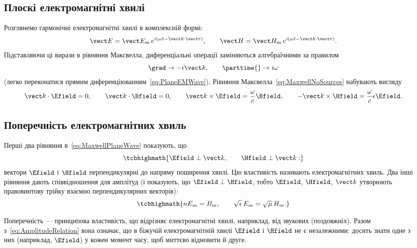 \subsection*{Плоскі електромагнітні хвилі}

Розглянемо гармонічні електромагнітні хвилі в комплексній формі:
\begin{equation}\label{eq:PlaneEMWave}
	\vect E = \vect E_m\, e^{i(\omega t-\vect k\cdot\vect r)}, \qquad \vect H = \vect H_m\, e^{i(\omega t-\vect k\cdot\vect r)}.
\end{equation}
Підставляючи ці вирази в рівняння Максвелла, диференціальні операції заміняються алгебраїчними за правилом
\begin{equation}\label{eq:OperatorSubstitution}
	\grad \to -i\vect k, \qquad \parttime{} \to i\omega
\end{equation}
(легко переконатися прямим диференціюванням~\eqref{eq:PlaneEMWave}). Рівняння Максвелла~\eqref{eq:MaxwellNoSources} набувають вигляду
\begin{equation}\label{eq:MaxwellPlaneWave}
	\vect k\cdot\Efield=0, \qquad \vect k\cdot\Bfield=0, \qquad \vect k\times\Efield = \frac\omega{c}\Bfield, \qquad -\vect k\times\Hfield =
	\frac\omega c\epsilon\Efield.
\end{equation}

\subsection*{Поперечність електромагнітних хвиль}

Перші два рівняння в~\eqref{eq:MaxwellPlaneWave} показують, що
\begin{equation}\label{eq:Transversality}
	\tcbhighmath{
		\Efield \perp \vect k, \qquad \Hfield \perp \vect k:
	}
\end{equation}
вектори $\Efield$ і $\Hfield$ перпендикулярні до напряму поширення хвилі. Цю властивість називають  електромагнітних хвиль.
Два інші рівняння дають співвідношення для амплітуд (і показують, що $\Efield\perp\Hfield$, тобто $\Efield$, $\Hfield$, $\vect k$ утворюють
правовинтову трійку взаємно перпендикулярних векторів):
\begin{equation}\label{eq:AmplitudeRelation}
	\tcbhighmath{
		nE_m = B_m, \qquad \sqrt\epsilon\, E_m = \sqrt\mu\, H_m.
	}
\end{equation}

\begin{Attention}
	Поперечність --- принципова властивість, що відрізняє електромагнітні хвилі, наприклад, від звукових (поздовжніх). Разом
	з~\eqref{eq:AmplitudeRelation} вона означає, що в біжучій електромагнітній хвилі $\Efield$ і $\Hfield$ не є незалежними: досить знати одне з
	них (наприклад, $\Efield$) у кожен момент часу, щоб миттєво відновити й друге.
\end{Attention}


